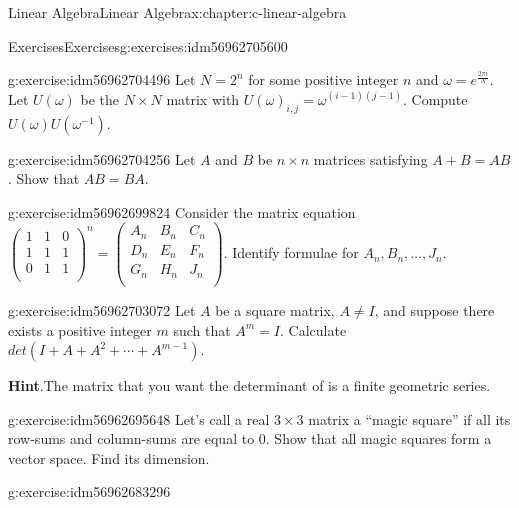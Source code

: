 \documentclass[twoside,10pt,]{book}
\newcommand{\blocktitlefont}{\relax}
\numberwithin{equation}{section}
\begin{document}
\begin{chapterptx}{Linear Algebra}{}{Linear Algebra}{}{}{x:chapter:c-linear-algebra}
%
\begin{exercises-section}{Exercises}{}{Exercises}{}{}{g:exercises:idm56962705600}
\begin{divisionexercise}{1}{}{}{g:exercise:idm56962704496}%
Let \(N=2^n\) for some positive integer \(n\) and \(\omega =e^{\frac{2\pi i}{N}}\).  Let \(U(\omega )\) be the \(N\times N\) matrix with \(U(\omega)_{i,j}= \omega^{(i-1)(j-1)}\).  Compute \(U(\omega )U\left(\omega ^{-1}\right)\).%
\end{divisionexercise}%
\begin{divisionexercise}{2}{}{}{g:exercise:idm56962704256}%
Let \(A\) and \(B\) be \(n\times n\) matrices satisfying \(A+B = A B\). Show that \(A B = B A\).%
\end{divisionexercise}%
\begin{divisionexercise}{3}{}{}{g:exercise:idm56962699824}%
Consider the matrix equation \(\left(
\begin{array}{ccc}
1 & 1 & 0 \\
1 & 1 & 1 \\
0 & 1 & 1 \\
\end{array}
\right)^n=\left(
\begin{array}{ccc}
A_n & B_n & C_n \\
D_n & E_n & F_n \\
G_n & H_n & J_n \\
\end{array}
\right)\).  Identify formulae for \(A_n, B_n,\ldots , J_n\).%
\end{divisionexercise}%
\begin{divisionexercise}{4}{}{}{g:exercise:idm56962703072}%
Let \(A\) be a square matrix, \(A \neq I\), and suppose there exists a positive integer \(m\) such that \(A^m=I\).  Calculate \(det(I + A + A^2 + \cdots + A^{m-1})\).%
\par\smallskip%
\noindent\textbf{\blocktitlefont Hint}.\hypertarget{g:hint:idm56962692592}{}\quad{}The matrix that you want the determinant of is a finite geometric series.%
\end{divisionexercise}%
\begin{divisionexercise}{5}{}{}{g:exercise:idm56962695648}%
Let's call a real \(3 \times 3\) matrix a ``magic square'' if all its row-sums and column-sums are equal to 0. Show that all magic squares form a vector space. Find its dimension.%
\end{divisionexercise}%
\begin{divisionexercise}{6}{}{}{g:exercise:idm56962683296}%

\end{divisionexercise}
\end{exercises-section}
\end{chapterptx}
\end{document}
